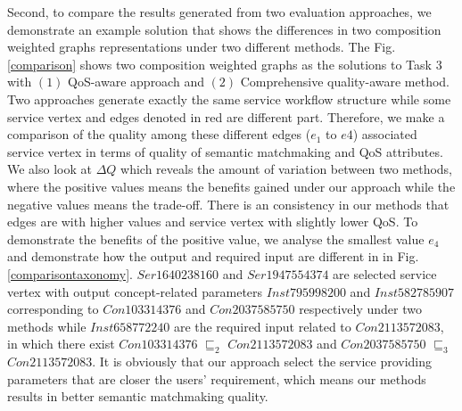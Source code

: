 \documentclass{llncs}
\begin{document}
Second, to compare the results generated from two evaluation approaches, we demonstrate an example solution that shows the differences in two composition weighted graphs representations under two different methods. The Fig. \ref{comparison} shows two composition weighted graphs as the solutions to Task 3 with $(1)$ QoS-aware approach and $(2)$ Comprehensive quality-aware method. Two approaches generate exactly the same service workflow structure while some service vertex and edges denoted in red are different part. Therefore, we make a comparison of the quality among these different edges ($e_1$ to $e4$) associated service vertex in terms of quality of semantic matchmaking and QoS attributes. We also look at $\Delta Q$ which reveals the amount of variation between two methods, where the positive values means the benefits gained under our approach while the negative values means the trade-off. There is an consistency in our methods that edges are with higher values and service vertex with slightly lower QoS. To demonstrate the benefits of the positive value, we analyse the smallest value $e_4$ and demonstrate how the output and required input are different in in Fig. \ref{comparisontaxonomy}. $Ser1640238160$ and $Ser1947554374$ are selected service vertex with output concept-related parameters $Inst795998200$ and $Inst582785907$ corresponding to $Con103314376$ and $Con2037585750$ respectively under two methods while $Inst658772240$ are the required input related to $Con2113572083$, in which there exist $Con103314376$ $\sqsubseteq_{2}$ $Con2113572083$ and $Con2037585750$ $\sqsubseteq_{3}$ $Con2113572083$. It is obviously that our approach select the service providing parameters that are closer the users' requirement, which means our methods results in better semantic matchmaking quality.
 
 
\end{document}

